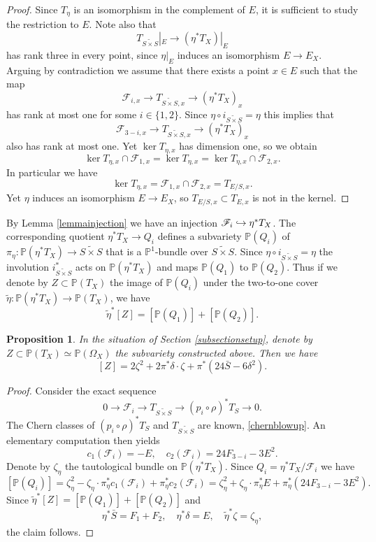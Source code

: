 \documentclass[JEP,XML,SOM,Unicode,NoEqCountersInSection,published]{cedram}
\let\mathcal\mathscr
\newcommand\hto{\mathrel{\lhook\joinrel\to}}
\theoremstyle{plain}
\newtheorem{proposition}[theorem]{Proposition}
\theoremstyle{definition}
\newcommand{\PP}{\ensuremath{\mathbb{P}}}
\newcommand{\holom}[3]{\ensuremath{#1:#2\to #3}}
\newcommand\sF{{\mathcal F}}
\newcommand{\blS}{\ensuremath{\widetilde{S \times S}}}
\begin{document}
\begin{proof}
Since $T_\eta$ is an isomorphism in the complement of $E$, it is sufficient to study the restriction to $E$.
Note also that
\[
T_{\blS}|_E \to (\eta^* T_X)|_E
\]
has rank three in every point, since $\eta|_E$ induces an isomorphism $E \to E_X$.
Arguing by contradiction we assume that there exists a point $x \in E$ such that the map
\[
\sF_{i,x} \to T_{\blS,x} \to (\eta^* T_X)_x
\]
has rank at most one for some $i \in \{1, 2 \}$. Since $\eta \circ i_{\blS} = \eta$ this implies that
\[
\sF_{3-i,x} \to T_{\blS,x} \to (\eta^* T_X)_x
\]
also has rank at most one. Yet $\ker T_{\eta,x}$ has dimension one, so we obtain
\[
\ker T_{\eta,x} \cap \sF_{1,x} = \ker T_{\eta,x} = \ker T_{\eta,x} \cap \sF_{2,x}.
\]
In particular we have
\[
\ker T_{\eta,x} = \sF_{1,x} \cap \sF_{2,x}= T_{E/S,x}.
\]
Yet $\eta$ induces an isomorphism $E \to E_X$, so $T_{E/S,x} \subset T_{E,x}$ is not in the kernel.
\end{proof}

By Lemma \ref{lemmainjection} we have an injection $\sF_i \hto \eta^* T_X$. The corresponding quotient
$\eta^* T_X \to Q_i$ defines a subvariety $\PP(Q_i)$ of $\holom{\pi_\eta}{\PP(\eta^* T_X)}{\blS}$
that is a $\PP^1$-bundle over $\blS$.
Since $\eta \circ i_{\blS} = \eta$ the involution $i_{\blS}^*$ acts on $\PP(\eta^* T_X)$ and maps
$\PP(Q_1)$ to $\PP(Q_2)$. Thus if we denote by $Z \subset \PP(T_X)$ the image of $\PP(Q_i)$ under
the two-to-one cover $\tilde \eta: \PP(\eta^* T_X) \to \PP(T_X)$, we have
\[
\tilde \eta^* [Z] = [\PP(Q_1)] + [\PP(Q_2)].
\]
\begin{proposition}
In the situation of Section \ref{subsectionsetup}, denote by $Z \subset \PP(T_X) \simeq \PP(\Omega_X)$ the subvariety constructed above. Then we have
\begin{equation} \label{classZ}
[Z] = 2 \zeta^2 + 2 \pi^* \delta \cdot \zeta + \pi^* (24 \bar S-6 \delta^2).
\end{equation}
\end{proposition}

\begin{proof}
Consider the exact sequence
\[
0 \to \sF_i \to T_{\blS} \to (p_i \circ \rho)^* T_S \to 0.
\]
The Chern classes of $(p_i \circ \rho)^* T_S$ and $T_{\blS}$ are known, \cf \eqref{chernblowup}.
An elementary computation then yields
\begin{equation} \label{chernFi}
c_1(\sF_i)=-E, \quad c_2(\sF_i) = 24 F_{3-i} - 3 E^2.
\end{equation}
Denote by $\zeta_\eta$ the tautological bundle on $\PP(\eta^* T_X)$.
Since $Q_i = \eta^* T_X/\sF_i$ we have
\[
[\PP(Q_i)] = \zeta_\eta^2 - \zeta_\eta \cdot \pi_\eta^* c_1(\sF_i) + \pi_\eta^* c_2(\sF_i)
=
\zeta_\eta^2 + \zeta_\eta \cdot \pi_\eta^* E + \pi_\eta^* (24 F_{3-i} - 3 E^2).
\]
Since $\tilde \eta^* [Z] = [\PP(Q_1)] + [\PP(Q_2)]$ and
\[
\eta^* \bar S = F_1+F_2, \quad \eta^* \delta = E, \quad \tilde \eta^* \zeta = \zeta_\eta,
\]
the claim follows.
\end{proof}
\end{document}
